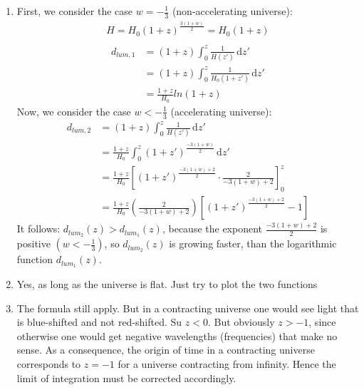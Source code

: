 \documentclass[a4paper,12pt]{article}
\begin{document}
\begin{enumerate}
\begin{enumerate}
			\item
				First, we consider the case $w=-\frac{1}{3}$ (non-accelerating universe):
				\begin{align*}
			H=H_0(1+z)^{\frac{3(1+w)}{2}}=H_0(1+z)\\
\end{align*}	
\begin{align*}
d_{lum,1}&=(1+z)\int_0^z \! \frac{1}{H(z')} \, \mathrm{d}z'\\
			&=(1+z)\int_0^z \! \frac{1}{H_0(1+z')} \, \mathrm{d}z'\\
			&=\frac{1+z}{H_0}ln(1+z)
\end{align*}						
	Now, we consider the case $w<-\frac{1}{3}$ (accelerating universe):
	\begin{align*}
				d_{lum,2}&=(1+z)\int_0^z \! \frac{1}{H(z')} \, \mathrm{d}z'\\
				&=\frac{1+z}{H_0}\int_0^z \! (1+z')^{\frac{-3(1+w)}{2}} \, \mathrm{d}z'\\
				&=\frac{1+z}{H_0}\left[(1+z')^{\frac{-3(1+w)+2}{2}}\cdot \frac{2}{-3(1+w)+2}\right]_0^z\\
				&=\frac{1+z}{H_0}\left(\frac{2}{-3(1+w)+2}\right)\left[(1+z')^{\frac{-3(1+w)+2}{2}}-1\right]
\end{align*}	
It follows:
$d_{lum_2}(z)>d_{lum_1}(z)$, because the exponent $\frac{-3(1+w)+2}{2}$ is positive $(w<-\frac{1}{3})$,
so $d_{lum_2}(z)$ is growing faster, than the logarithmic function $d_{lum_1}(z)$.		
			\item Yes, as long as the universe is flat. Just try to plot the two functions
			\item The formula still apply. But in a
                          contracting universe one would see light
                          that is blue-shifted and not red-shifted. Su
                          $z<0$. But obviously $z>-1$, since otherwise one
                          would get negative wavelengths (frequencies)
                          that make no sense. As a consequence, the
                          origin of time in a contracting universe
                          corresponds to $z=-1$ for a universe
                          contracting from infinity. Hence the limit
                          of integration must be corrected accordingly.
		\end{enumerate}
		
	\end{enumerate}
\end{document}
